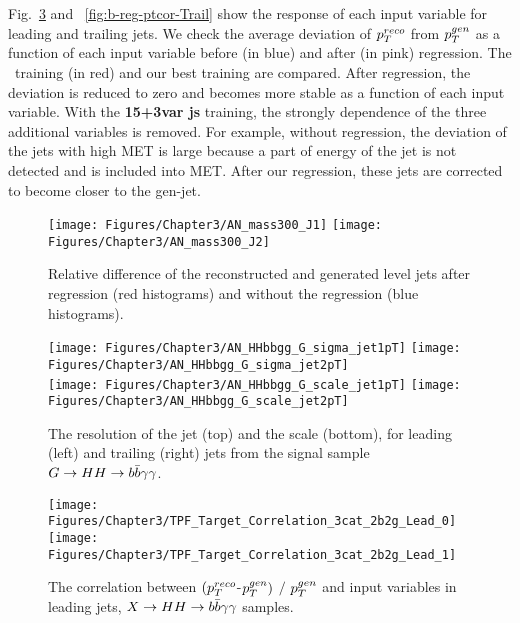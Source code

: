 Fig.~\ref{fig:b-reg-ptcor-Lead} and ~\ref{fig:b-reg-ptcor-Trail} show the response of each input variable for leading and trailing jets.
We check the average deviation of $p_{T}^{reco}$ from $p_{T}^{gen}$ as a function of each input variable before (in blue) and after (in pink) regression. 
The \Hbb~training (in red) and our best training are compared.
After regression, the \PT deviation is reduced to zero and becomes more stable as a function of each input variable.
With the \textbf{15+3var js} training, the strongly dependence of the three additional variables is removed.
For example, without regression, the \PT deviation of the jets with high MET is large because a part of energy of the jet is not detected and is included into MET.
After our regression, these jets are corrected to become closer to the gen-jet.

\begin{figure*}[bth]
  \centering
  \texttt{[image: Figures/Chapter3/AN\_mass300\_J1]}\hfil
  \texttt{[image: Figures/Chapter3/AN\_mass300\_J2]}\hfil
  \caption{Relative \PT difference of the reconstructed and generated
    level jets after regression (red histograms) and without
    the regression (blue histograms).}
  \label{fig:b-reg-pt-res}
\end{figure*}

\begin{figure*}[bth]
  \centering
  \texttt{[image: Figures/Chapter3/AN\_HHbbgg\_G\_sigma\_jet1pT]}\hfil
  \texttt{[image: Figures/Chapter3/AN\_HHbbgg\_G\_sigma\_jet2pT]}\hfil\\
  \texttt{[image: Figures/Chapter3/AN\_HHbbgg\_G\_scale\_jet1pT]}\hfil
  \texttt{[image: Figures/Chapter3/AN\_HHbbgg\_G\_scale\_jet2pT]}\hfil\\
  \caption{The resolution of the jet \PT (top) and the scale (bottom),
    for leading (left) and trailing (right) jets from the signal
    sample $G\to HH\to b\bar{b}\gamma\gamma$.}
  \label{fig:b-reg-jet-res}
\end{figure*}

\begin{figure*}[bth]
  \centering
  \texttt{[image: Figures/Chapter3/TPF\_Target\_Correlation\_3cat\_2b2g\_Lead\_0]}\hfil
  \texttt{[image: Figures/Chapter3/TPF\_Target\_Correlation\_3cat\_2b2g\_Lead\_1]}\hfil
  \caption{The correlation between $(p_{T}^{reco}$-$p_{T}^{gen})$ $/$ $p_{T}^{gen}$ 
  and input variables in leading jets, $X\to HH\to b\bar{b}\gamma\gamma$ samples.}
  \label{fig:b-reg-ptcor-Lead}
\end{figure*}

